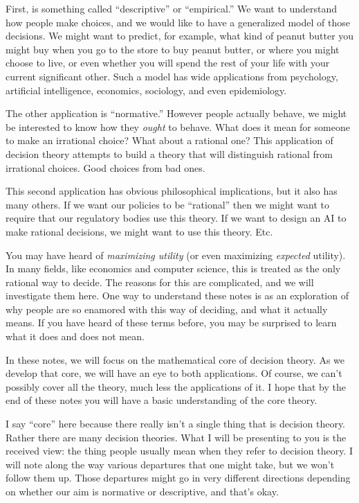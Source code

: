 \documentclass[justified,nobib]{tufte-book}
\begin{document}
First, is something called ``descriptive'' or ``empirical.'' We want to understand how people make choices, and we would like to have a generalized model of those decisions. We might want to predict, for example, what kind of peanut butter you might buy when you go to the store to buy peanut butter, or where you might choose to live, or even whether you will spend the rest of your life with your current significant other.  Such a model has wide applications from psychology, artificial intelligence, economics, sociology, and even epidemiology.

The other application is ``normative.''  However people actually behave, we might be interested to know how they {\it ought} to behave.  What does it mean for someone to make an irrational choice? What about a rational one? This application of decision theory attempts to build a theory that will distinguish rational from irrational choices.  Good choices from bad ones.

This second application has obvious philosophical implications, but it also has many others.  If we want our policies to be ``rational'' then we might want to require that our regulatory bodies use this theory.  If we want to design an AI to make rational decisions, we might want to use this theory. Etc.

You may have heard of {\it maximizing utility} (or even maximizing {\it expected} utility).  In many fields, like economics and computer science, this is treated as the only rational way to decide.  The reasons for this are complicated, and we will investigate them here. One way to understand these notes is as an exploration of why people are so enamored with this way of deciding, and what it actually means. If you have heard of these terms before, you may be surprised to learn what it does and does not mean.

In these notes, we will focus on the mathematical core of decision theory.  As we develop that core, we will have an eye to both applications.  Of course, we can't possibly cover all the theory, much less the applications of it. I hope that by the end of these notes you will have a basic understanding of the core theory.

I say ``core'' here because there really isn't a single thing that is decision theory. Rather there are many decision theories.  What I will be presenting to you is the received view: the thing people usually mean when they refer to decision theory.  I will note along the way various departures that one might take, but we won't follow them up.  Those departures might go in very different directions depending on whether our aim is normative or descriptive, and that's okay.
\end{document}
